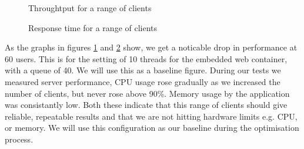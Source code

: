 \begin{figure}[ht]
 \centering
 \caption{Throughtput for a range of clients}
 \label{graph_response_tp}
\end{figure}

\begin{figure}[ht]
 \centering
 \caption{Response time for a range of clients}
 \label{graph_response_rt}
\end{figure}

As the graphs in figures \ref{graph_response_tp} and \ref{graph_response_rt} show, we get a noticable drop in performance at 60 users. This is for the setting of 10 threads for the embedded web container, with a queue of 40. We will use this as a baseline figure. During our tests we measured server performance, CPU usage rose gradually as we increased the number of clients, but never rose above 90\%. Memory usage by the application was consistantly low. Both these indicate that this range of clients should give reliable, repeatable results and that we are not hitting hardware limits e.g. CPU, or memory. We will use this configuration as our baseline during the optimisation process.

